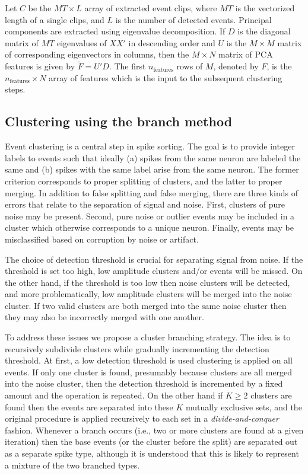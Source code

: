 \documentclass{article}
\begin{document}
Let $C$ be the $MT \times L$ array of extracted event clips, where $MT$ is the vectorized length of a single clips, and $L$ is the number of detected events. Principal components are extracted using eigenvalue decomposition. If $D$ is the diagonal matrix of $MT$ eigenvalues of $XX'$ in descending order and $U$ is the $M\times M$ matrix of corresponding eigenvectors in columns, then the $M\times N$ matrix of PCA features is given by $\tilde{F}=U'D$. The first $n_{\text{features}}$ rows of $M$, denoted by $F$, is the $n_{\text{features}}\times N$ array of features which is the input to the subsequent clustering steps.

\subsection{Clustering using the branch method}

Event clustering is a central step in spike sorting. The goal is to provide integer labels to events such that ideally (a) spikes from the same neuron are labeled the same and (b) spikes with the same label arise from the same neuron. The former criterion corresponds to proper splitting of clusters, and the latter to proper merging. In addition to false splitting and false merging, there are three kinds of errors that relate to the separation of signal and noise. First, clusters of pure noise may be present. Second, pure noise or outlier events may be included in a cluster which otherwise corresponds to a unique neuron. Finally, events may be misclassified based on corruption by noise or artifact.

The choice of detection threshold is crucial for separating signal from noise. If the threshold is set too high, low amplitude clusters and/or events will be missed. On the other hand, if the threshold is too low then noise clusters will be detected, and more problematically, low amplitude clusters will be merged into the noise cluster. If two valid clusters are both merged into the same noise cluster then they may also be incorrectly merged with one another.

To address these issues we propose a cluster branching strategy. The idea is to recursively subdivide clusters while gradually incrementing the detection threshold. At first, a low detection threshold is used clustering is applied on all events. If only one cluster is found, presumably because clusters are all merged into the noise cluster, then the detection threshold is incremented by a fixed amount and the operation is repeated. On the other hand if $K\geq 2$ clusters are found then the events are separated into these $K$ mutually exclusive sets, and the original procedure is applied recursively to each set in a \emph{divide-and-conquer} fashion. Whenever a branch occurs (i.e., two or more clusters are found at a given iteration) then the base events (or the cluster before the split) are separated out as a separate spike type, although it is understood that this is likely to represent a mixture of the two branched types.
\end{document}
